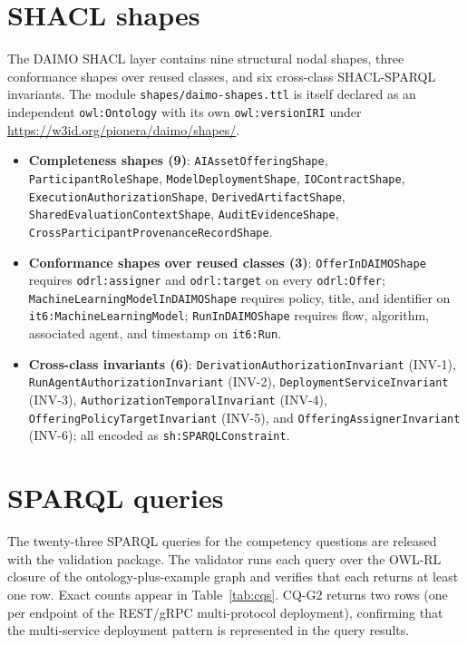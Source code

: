 \documentclass[Afour,sagev,times]{sagej}
\newcommand{\code}[1]{\texttt{#1}}
\begin{document}
\section{SHACL shapes}\label{app:shapes}

The DAIMO SHACL layer contains nine structural nodal shapes, three conformance shapes over reused classes, and six cross-class SHACL-SPARQL invariants. The module \code{shapes/daimo-shapes.ttl} is itself declared as an independent \code{owl:Ontology} with its own \code{owl:versionIRI} under \url{https://w3id.org/pionera/daimo/shapes/}.

\begin{itemize}[leftmargin=*]
\item \textbf{Completeness shapes (9)}: \code{AIAssetOfferingShape}, \code{ParticipantRoleShape}, \code{ModelDeploymentShape}, \code{IOContractShape}, \code{ExecutionAuthorizationShape}, \code{DerivedArtifactShape}, \code{SharedEvaluationContextShape}, \code{AuditEvidenceShape}, \code{CrossParticipantProvenanceRecordShape}.
\item \textbf{Conformance shapes over reused classes (3)}: \code{OfferInDAIMOShape} requires \code{odrl:assigner} and \code{odrl:target} on every \code{odrl:Offer}; \code{MachineLearningModelInDAIMOShape} requires policy, title, and identifier on \code{it6:MachineLearningModel}; \code{RunInDAIMOShape} requires flow, algorithm, associated agent, and timestamp on \code{it6:Run}.
\item \textbf{Cross-class invariants (6)}: \code{DerivationAuthorizationInvariant} (INV-1), \code{RunAgentAuthorizationInvariant} (INV-2), \code{DeploymentServiceInvariant} (INV-3), \code{AuthorizationTemporalInvariant} (INV-4), \code{OfferingPolicyTargetInvariant} (INV-5), and \code{OfferingAssignerInvariant} (INV-6); all encoded as \code{sh:SPARQLConstraint}.
\end{itemize}

\section{SPARQL queries}\label{app:sparql}

The twenty-three SPARQL queries for the competency questions are released with the validation package. The validator runs each query over the OWL-RL closure of the ontology-plus-example graph and verifies that each returns at least one row. Exact counts appear in Table~\ref{tab:cqs}. CQ-G2 returns two rows (one per endpoint of the REST/gRPC multi-protocol deployment), confirming that the multi-service deployment pattern is represented in the query results.
\end{document}
